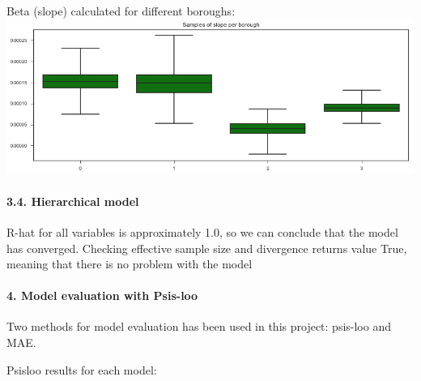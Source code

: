 \documentclass[11pt]{article}
\makeatletter
\def\maxwidth{\ifdim\Gin@nat@width>\linewidth\linewidth
    \else\Gin@nat@width\fi}
\let\Oldincludegraphics\includegraphics
\renewcommand{\includegraphics}[1]{\Oldincludegraphics[width=.8\maxwidth]{#1}}
\makeatother
\begin{document}
Beta (slope) calculated for different boroughs:
\includegraphics{./Fig/nyc/Slope_Varymodel.png}

\paragraph{3.4. Hierarchical model}\label{hierarchical-model}

R-hat for all variables is approximately 1.0, so we can conclude that
the model has converged. Checking effective sample size and divergence
returns value True, meaning that there is no problem with the model

    \paragraph{4. Model evaluation with
Psis-loo}\label{model-evaluation-with-psis-loo}

Two methods for model evaluation has been used in this project: psis-loo
and MAE.

Psisloo results for each model:
\end{document}
